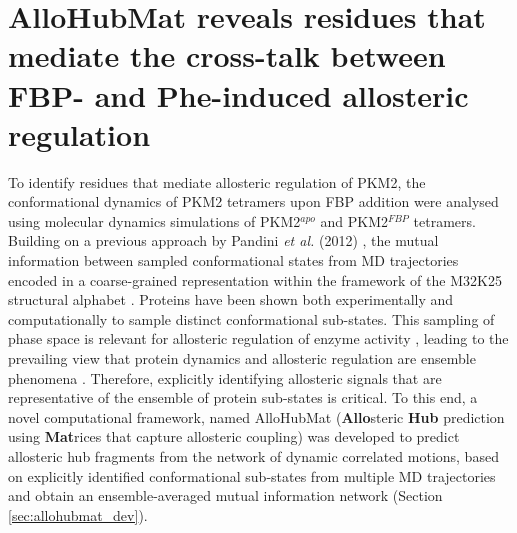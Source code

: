 \section{AlloHubMat reveals residues that mediate the cross-talk between FBP- and Phe-induced allosteric regulation}
To identify residues that mediate allosteric regulation of PKM2, the conformational dynamics of PKM2 tetramers upon FBP addition were analysed using molecular dynamics simulations of PKM2$^{apo}$ and PKM2$^{FBP}$ tetramers. Building on a previous approach by Pandini \textit{et al.} (2012) \cite{Pandini:2012aa}, the mutual information between sampled conformational states from MD trajectories encoded in a coarse-grained representation within the framework of the M32K25 structural alphabet \cite{Pandini:2010aa}. Proteins have been shown both experimentally \cite{Salvi:2016ab,Markwick:2009aa,Guerry:2013aa} and computationally \cite{Schmidt:2017aa,Daura:2001aa} to sample distinct conformational sub-states. This sampling of phase space is relevant for allosteric regulation of enzyme activity \cite{Sol:2009aa,Kern:2003aa,Eisenmesser:2005aa,Salvi:2016aa}, leading to the prevailing view that protein dynamics and allosteric regulation are ensemble phenomena \cite{Motlagh:2014aa}. Therefore, explicitly identifying allosteric signals that are representative of the ensemble of protein sub-states is critical. To this end, a novel computational framework, named AlloHubMat (\textbf{Allo}steric \textbf{Hub} prediction using \textbf{Mat}rices that capture allosteric coupling) was developed to predict allosteric hub fragments from the network of dynamic correlated motions, based on explicitly identified conformational sub-states from multiple MD trajectories and obtain an ensemble-averaged mutual information network (Section \ref{sec:allohubmat_dev}).
%
%
\\\\
%
%
